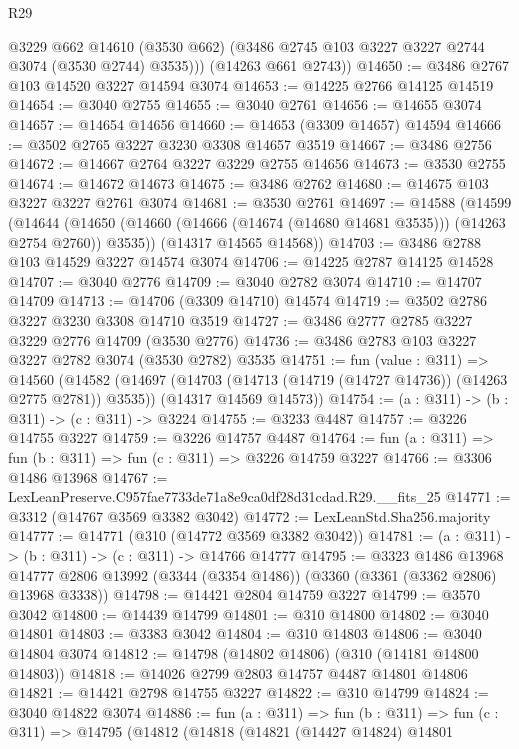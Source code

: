 \begin{lexlean}{R29}
\begin{coremodule}
          @3229
          @662
          @14610
          (@3530 @662)
          (@3486 @2745 @103 @3227 @3227 @2744 @3074 (@3530 @2744) @3535)))
      (@14263 @661 @2743))
@14650 := @3486 @2767 @103 @14520 @3227 @14594 @3074
@14653 := @14225 @2766 @14125 @14519
@14654 := @3040 @2755
@14655 := @3040 @2761
@14656 := @14655 @3074
@14657 := @14654 @14656
@14660 := @14653 (@3309 @14657) @14594
@14666 := @3502 @2765 @3227 @3230 @3308 @14657 @3519
@14667 := @3486 @2756
@14672 := @14667 @2764 @3227 @3229 @2755 @14656
@14673 := @3530 @2755
@14674 := @14672 @14673
@14675 := @3486 @2762
@14680 := @14675 @103 @3227 @3227 @2761 @3074
@14681 := @3530 @2761
@14697 := @14588
    (@14599
      (@14644 (@14650 (@14660 (@14666 (@14674 (@14680 @14681 @3535))) (@14263 @2754 @2760)) @3535))
      (@14317 @14565 @14568))
@14703 := @3486 @2788 @103 @14529 @3227 @14574 @3074
@14706 := @14225 @2787 @14125 @14528
@14707 := @3040 @2776
@14709 := @3040 @2782 @3074
@14710 := @14707 @14709
@14713 := @14706 (@3309 @14710) @14574
@14719 := @3502 @2786 @3227 @3230 @3308 @14710 @3519
@14727 := @3486 @2777 @2785 @3227 @3229 @2776 @14709 (@3530 @2776)
@14736 := @3486 @2783 @103 @3227 @3227 @2782 @3074 (@3530 @2782) @3535
@14751 := fun (value : @311) =>
  @14560
    (@14582
      (@14697 (@14703 (@14713 (@14719 (@14727 @14736)) (@14263 @2775 @2781)) @3535))
      (@14317 @14569 @14573))
@14754 := (a : @311) -> (b : @311) -> (c : @311) -> @3224
@14755 := @3233 @4487
@14757 := @3226 @14755 @3227
@14759 := @3226 @14757 @4487
@14764 := fun (a : @311) => fun (b : @311) => fun (c : @311) => @3226 @14759 @3227
@14766 := @3306 @1486 @13968
@14767 := LexLeanPreserve.C957fae7733de71a8e9ca0df28d31cdad.R29.__fits_25
@14771 := @3312 (@14767 @3569 @3382 @3042)
@14772 := LexLeanStd.Sha256.majority
@14777 := @14771 (@310 (@14772 @3569 @3382 @3042))
@14781 := (a : @311) -> (b : @311) -> (c : @311) -> @14766 @14777
@14795 := @3323
    @1486
    @13968
    @14777
    @2806
    @13992
    (@3344 (@3354 @1486))
    (@3360 (@3361 (@3362 @2806) @13968 @3338))
@14798 := @14421 @2804 @14759 @3227
@14799 := @3570 @3042
@14800 := @14439 @14799
@14801 := @310 @14800
@14802 := @3040 @14801
@14803 := @3383 @3042
@14804 := @310 @14803
@14806 := @3040 @14804 @3074
@14812 := @14798 (@14802 @14806) (@310 (@14181 @14800 @14803))
@14818 := @14026 @2799 @2803 @14757 @4487 @14801 @14806
@14821 := @14421 @2798 @14755 @3227
@14822 := @310 @14799
@14824 := @3040 @14822 @3074
@14886 := fun (a : @311) =>
  fun (b : @311) =>
  fun (c : @311) =>
  @14795
    (@14812
      (@14818
        (@14821
          (@14427 @14824)
          @14801

\end{coremodule}
\end{lexlean}

